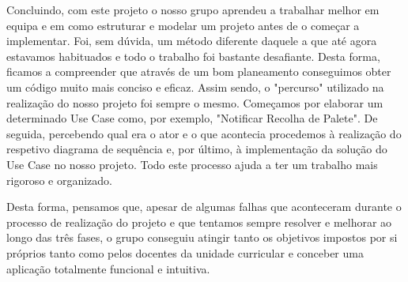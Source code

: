 \documentclass[11pt]{article}
\begin{document}
Concluindo, com este projeto o nosso grupo aprendeu a trabalhar melhor em equipa e em como estruturar e modelar um projeto antes de o começar a implementar. Foi, sem dúvida, um método diferente daquele a que até agora estavamos habituados e todo o trabalho foi bastante desafiante. Desta forma, ficamos a compreender que através de um bom planeamento conseguimos obter um código muito mais conciso e eficaz. Assim sendo, o "percurso" utilizado na realização do nosso projeto foi sempre o mesmo. Começamos por elaborar um determinado Use Case como, por exemplo, "Notificar Recolha de Palete". De seguida, percebendo qual era o ator e o que acontecia procedemos à realização do respetivo diagrama de sequência e, por último, à implementação da solução do Use Case no nosso projeto. Todo este processo ajuda a ter um trabalho mais rigoroso e organizado.

Desta forma, pensamos que, apesar de algumas falhas que aconteceram durante o processo de realização do projeto e que tentamos sempre resolver e melhorar ao longo das três fases, o grupo conseguiu atingir tanto os objetivos impostos por si próprios tanto como pelos docentes da unidade curricular e conceber uma aplicação totalmente funcional e intuitiva.
\end{document}
